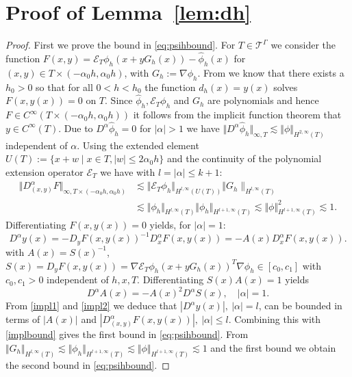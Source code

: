 \documentclass[final]{siamltex}
\begin{document}
\section{Proof of Lemma~\ref{lem:dh}} \label{sec:proof:lem:dh}
\begin{proof}
First we prove the bound in \eqref{eq:psihbound}.
For $T \in {{\mathcal T}^{\Gamma}}$ we consider the function $F(x,y) = \mathcal{E}_T \phi_h (x + y G_h(x))-{\hat \phi_h}(x)$ for $(x,y) \in T \times (-\alpha_0 h, \alpha_0 h)$, with $G_h:= \nabla \phi_h$. 
From \cite[Lemma 3.2]{CLARH1} we know that there exists a $h_0 > 0$ so that for all $0< h < h_0$ the function $d_h(x) = y(x)$ solves $F(x,y(x)) = 0$ on $T$. 
Since ${\hat \phi_h}, \mathcal{E}_T \phi_h$ and $G_h$ are polynomials and hence 
$F \in C^{\infty}(T \times (-\alpha_0 h, \alpha_0 h))$ it follows from the implicit function theorem that $y \in C^{\infty}(T)$.
Due to $D^{\alpha} {\hat \phi_h} = 0$ for $|\alpha|>1$ we have $\Vert D^{\alpha} {\hat \phi_h} \Vert_{\infty,T} \lesssim \Vert \phi \Vert_{H^{2,\infty}(T)}$ independent of $\alpha$. Using the extended element $U(T) := \{x+w\mid x \in T, |w| \leq 2 \alpha_0 h \}$ and the continuity of the polynomial extension operator $\mathcal{E}_T$ we have with $l = |\alpha|\leq k+1$:
\begin{equation} \label{implbound} \begin{split}
  \Vert D^{\alpha}_{(x,y)} F \Vert_{\infty,T\times(-\alpha_0 h, \alpha_0 h)} &
  \lesssim \Vert \mathcal{E}_T \phi_h \Vert_{H^{l,\infty}(U(T))} \Vert G_h\|_{H^{l,\infty}(T)} \\
  & \lesssim \Vert \phi_h \Vert_{H^{l,\infty}(T)}\Vert\phi_h\Vert_{H^{l+1,\infty}(T)} \lesssim\Vert\phi\Vert_{H^{l+1,\infty}(T)}^2 \lesssim 1. 
\end{split} \end{equation}
Differentiating $F(x,y(x))=0$ yields, for $|\alpha|=1$:
\begin{equation} \label{impl1}
D^{\alpha} y(x) = - D_y F(x,y(x))^{-1} D_x^{\alpha} F(x,y(x)) = -A(x) D_x^{\alpha} F(x,y(x)).
\end{equation}
with $A(x) = S(x)^{-1}$, $S(x) = D_y F(x,y(x)) = \nabla \mathcal{E}_T \phi_h (x + y G_h(x))^T \nabla \phi_h \in [c_0,c_1]$ with $c_0,c_1 > 0$ independent of $h, x, T$. Differentiating $S(x) A(x) = 1$ yields 
\begin{equation} \label{impl2}
D^{\alpha} A(x) = - A(x)^2 D^{\alpha} S(x), \quad |\alpha|=1.
\end{equation}
From \eqref{impl1} and \eqref{impl2} we deduce that $| D^{\alpha} y(x)|,~|\alpha|=l$, can be bounded in terms of $\vert A(x) \vert$ and $| D^{\alpha}_{(x,y)} F(x,y(x))|,~|\alpha|\leq l$. Combining this with \eqref{implbound} gives the first bound in \eqref{eq:psihbound}.
From $\Vert G_h \Vert_{H^{l,\infty}(T)} \lesssim \Vert \phi_h \Vert_{H^{l+1,\infty}(T)} \lesssim \Vert \phi \Vert_{H^{l+1,\infty}(T)}\lesssim 1$
and the first bound we obtain the second bound in \eqref{eq:psihbound}.


\end{proof}
\end{document}
